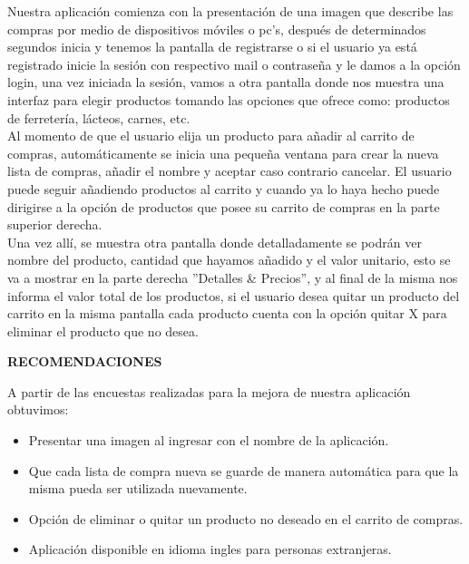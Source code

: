\documentclass [11pt] {article}
\begin{document}
Nuestra aplicación comienza con la presentación de una imagen que describe las compras por medio de dispositivos móviles o pc’s, después de determinados segundos inicia y tenemos la pantalla de registrarse o si el usuario ya está registrado inicie la sesión con respectivo mail o contraseña y le damos a la opción login, una vez iniciada la sesión, vamos a otra pantalla donde nos muestra una interfaz para elegir productos tomando las opciones que ofrece como: productos de ferretería, lácteos, carnes, etc. 
\\
\newline
Al momento de que el usuario elija un producto para añadir al carrito de compras, automáticamente se inicia una pequeña ventana para crear la nueva lista de compras, añadir el nombre y aceptar caso contrario cancelar. El usuario puede seguir añadiendo productos al carrito y cuando ya lo haya hecho puede dirigirse a la opción de productos que posee su carrito de compras en la parte superior derecha.
\\
\newline
Una vez allí, se muestra otra pantalla donde detalladamente se podrán ver nombre del producto, cantidad que hayamos añadido y el valor unitario, esto se va a mostrar en la parte derecha ''Detalles \& Precios'', y al final de la misma nos informa el valor total de los productos, si el usuario desea quitar un producto del carrito en la misma pantalla cada producto cuenta con la opción quitar X para eliminar el producto que no desea.
\\

\begin{center}
 \bf RECOMENDACIONES \\
\end{center}

A partir de las encuestas realizadas para la mejora de nuestra aplicación obtuvimos:\\
\begin{itemize}
\item Presentar una imagen al ingresar con el nombre de la aplicación.\\
\item Que cada lista de compra nueva se guarde de manera automática para que la misma pueda ser utilizada nuevamente.\\
\item Opción de eliminar o quitar un producto no deseado en el carrito de compras.\\
\item Aplicación disponible en idioma ingles para personas extranjeras.\\
\end{itemize}
\end{document}
